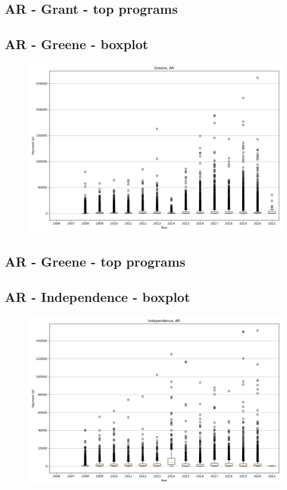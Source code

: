 \subsection*{AR - Grant - top programs}

\newpage
\subsection*{AR - Greene - boxplot}
\begin{figure}[h]
\centering
\includegraphics[width=7in]{../output/boxplots/counties/Greene-AR_boxplot.png}
\end{figure}


\subsection*{AR - Greene - top programs}

\newpage
\subsection*{AR - Independence - boxplot}
\begin{figure}[h]
\centering
\includegraphics[width=7in]{../output/boxplots/counties/Independence-AR_boxplot.png}
\end{figure}


